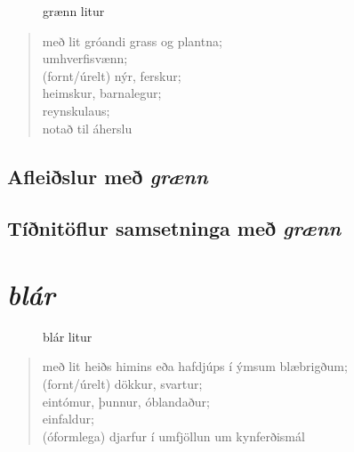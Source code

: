 \documentclass[12pt,b5paper,twosided,openany]{book}
\begin{document}
\begin{figure}[H]
\begin{tcolorbox}
	\centering
\end{tcolorbox}
	\caption{grænn litur}
	\label{mynd:graent}
\end{figure}

\begin{quote}
með lit gróandi grass og plantna; \\
umhverfisvænn; \\
(fornt/úrelt) nýr, ferskur; \\
heimskur, barnalegur; \\
reynskulaus; \\
notað til áherslu
\end{quote}

\section{Afleiðslur með \textit{grænn}}
\label{afl:graenafl}


\section{Tíðnitöflur samsetninga með \textit{grænn}}
\label{tidni:graentid}


\chapter{\textit{blár}}
\label{kafli:blar}

\begin{figure}[H]
\begin{tcolorbox}
	\centering
\end{tcolorbox}
	\caption{blár litur}
	\label{mynd:blatt}
\end{figure}

\begin{quote}
með lit heiðs himins eða hafdjúps í ýmsum blæbrigðum; \\
(fornt/úrelt) dökkur, svartur; \\
eintómur, þunnur, óblandaður; \\
einfaldur; \\
(óformlega) djarfur í umfjöllun um kynferðismál
\end{quote}
\clearpage
\end{document}
